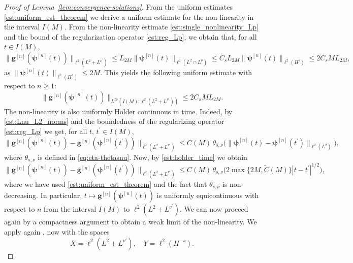 \documentclass[12pt,a4paper]{amsart}
\numberwithin{equation}{section}
\newcommand{\ulg}{\boldsymbol{g}}
\newcommand{\ulpsi}{\boldsymbol{\psi}}
\newcommand{\Clip}[1]{L_{#1}}
\newcommand{\thetasnu}{\theta_{s,\nu}}
\begin{document}
\begin{proof}[Proof of Lemma~\ref{lem:convergence-solutions}]
		From the uniform estimates \eqref{est:uniform_est_theorem} we derive a uniform estimate for the non-linearity in the interval $ I(M) $. From the non-linearity estimate \eqref{est:single_nonlinearity_Lp} and the bound of the regularization operator \eqref{est:reg_Lp}, we obtain that, for all $t \in I(M) $,
		\begin{equation}
			\| \ulg^{[n]}(\ulpsi^{[n]}(t)) \|_{\ell^2(L^2+L^{\nu^\prime})} \leq \Clip{2M} \| \ulpsi^{[n]}(t) \|_{\ell^2(L^2\cap L^{\nu})}
			\leq C_s \Clip{2M} \| \ulpsi^{[n]}(t) \|_{\ell^2(H^s)}
			\leq 2 C_s M \Clip{2M} ,
		\end{equation}
		as $\| \ulpsi^{[n]}(t) \|_{\ell^2(H^s)}\leq 2M$. This yields the following uniform estimate with respect to $n \geq 1 $:
		\begin{equation}\label{est:uniform_theorem_nonlin}
			\| \ulg^{[n]}(\ulpsi^{[n]}(t)) \|_{L^{\infty}(I(M);\ell^2(L^2+L^{\nu^\prime}))} \leq 2 C_s M \Clip{2M} .
		\end{equation}
		The non-linearity is also uniformly Hölder continuous in time. Indeed, by \eqref{est:Lnu_L2_norms} and the boundedness of the regularizing operator \eqref{est:reg_Lp} we get, for all $ t, \, t^\prime \in I(M) $,
		\begin{equation}
			\| \ulg^{[n]}(\ulpsi^{[n]}(t)) - \ulg^{[n]}(\ulpsi^{[n]}(t^\prime)) \|_{\ell^2(L^2+L^{\nu^\prime})} \leq C(M)\, \thetasnu  \big( \| \ulpsi^{[n]}(t)-\ulpsi^{[n]}(t^\prime) \|_{\ell^2(L^2)}\big),
		\end{equation}
		where $\thetasnu$ is defined in \eqref{eq:eta-thetasnu}.  Now, by \eqref{est:holder_time} we obtain
		\begin{equation}\label{eq:equicontinuity-approximated-non-linearity}
			\| \ulg^{[n]}(\ulpsi^{[n]}(t)) - \ulg^{[n]}(\ulpsi^{[n]}(t^\prime)) \|_{\ell^2(L^2+L^{\nu^\prime})}  
			\leq C(M)  \, \thetasnu \big(2 \max\{2M , \tilde{C}(M)\}  |t-t^\prime|^{1/2}\big) ,
		\end{equation}
		where we have used \eqref{est:uniform_est_theorem} and the fact that $\thetasnu $ is non-decreasing. 
		In particular, $t \mapsto \ulg^{[n]}(\ulpsi^{[n]}(t))$ is uniformly equicontinuous with respect to $n$ from the interval $ I(M) $ to $\ell^2(L^2+L^{\nu^\prime})$. 
		We can now proceed again by a compactness argument to obtain a weak limit of the non-linearity. We apply again \cite[Proposition 1.1.2]{cazenave2003semilinear}, now with the spaces 
		\begin{equation}
			X= \ell^2(L^2+ L^{\nu'}), \quad  Y = \ell^2(H^{-s}) .
		\end{equation}

\end{proof}
\end{document}
